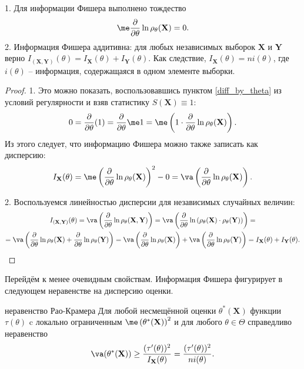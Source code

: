 \begin{proposition}\label{fisher_simple}
    1. Для информации Фишера выполнено тождество
    \[
    \me \frac{\partial}{\partial \theta} \ln{\rho_{\theta}(\mathbf X)} = 0.
    \]
    2. Информация Фишера аддитивна: для любых независимых выборок $\mathbf X$ и $\mathbf Y$ верно $I_{(\mathbf X, \mathbf Y)}(\theta) = I_{\mathbf X}(\theta) + I_{\mathbf Y}(\theta)$. Как следствие, $I_{\mathbf X}(\theta) = ni(\theta)$, где $i(\theta)$ -- информация, содержащаяся в одном элементе выборки.
\end{proposition}

\begin{proof}
    1. Это можно показать, воспользовавшись пунктом \ref{diff_by_theta} из условий регулярности и взяв статистику $S(\mathbf X)\equiv 1$:
    \[
    0 = \frac{\partial}{\partial \theta} (1) = \frac{\partial}{\partial \theta} \me 1 = \me \left(1\cdot\frac{\partial}{\partial\theta}\ln{\rho_{\theta}(\mathbf X)}\right).
    \]
    Из этого следует, что информацию Фишера можно также записать как дисперсию:
    \[
    I_{\mathbf X}(\theta) = \me \left(\frac{\partial}{\partial\theta}\ln{\rho_{\theta}(\mathbf X)}\right)^2 - 0 = \va \left(\frac{\partial}{\partial\theta}\ln{\rho_{\theta}(\mathbf X)}\right).
    \]
    
    2. Воспользуемся линейностью дисперсии для независимых случайных величин:
    \begin{gather*}
    I_{(\mathbf X, \mathbf Y)}(\theta) = \va \left(\frac{\partial}{\partial\theta}\ln{\rho_{\theta}(\mathbf X, \mathbf Y)}\right) = \va \left(\frac{\partial}{\partial\theta}\ln{(\rho_{\theta}(\mathbf X)\cdot \rho_{\theta}(\mathbf Y))}\right) =  \\
    = \va \left(\frac{\partial}{\partial\theta}\ln{\rho_{\theta}(\mathbf X)} +\frac{\partial}{\partial\theta}\ln{\rho_{\theta}(\mathbf Y)}\right) = \va \left(\frac{\partial}{\partial\theta}\ln{\rho_{\theta}(\mathbf X)}\right) +\va \left(\frac{\partial}{\partial\theta}\ln{\rho_{\theta}(\mathbf Y)}\right) = I_{\mathbf X}(\theta) + I_{\mathbf Y}(\theta).
    \end{gather*}
\end{proof}

Перейдём к менее очевидным свойствам. Информация Фишера фигурирует в следующем неравенстве на дисперсию оценки.

\begin{theorem}{неравенство Рао-Крамера}{}
    Для любой несмещённой оценки $\theta^*(\mathbf X)$ функции $\tau(\theta)$ c локально ограниченным $\me \left(\theta^*(\mathbf X)\right)^2$ и для любого $\theta \in \Theta$ справедливо неравенство
    \[
    \va (\theta^*(\mathbf X)) \ge \frac{(\tau'(\theta))^2}{I_{\mathbf X}(\theta)} = \frac{(\tau'(\theta))^2}{ni(\theta)}.
    \]
\end{theorem}

